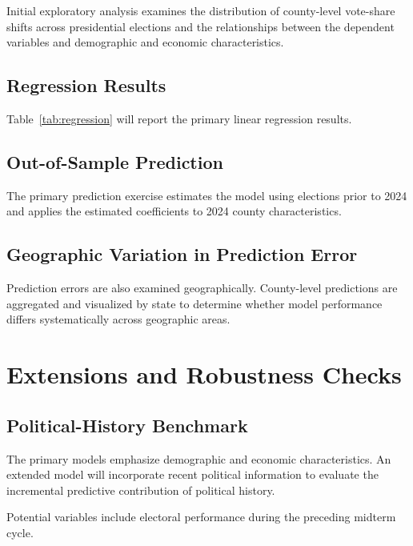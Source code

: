 \documentclass[12pt]{article}
\begin{document}
	Initial exploratory analysis examines the distribution of county-level
	vote-share shifts across presidential elections and the relationships
	between the dependent variables and demographic and economic
	characteristics.
	
	
	\subsection{Regression Results}
	
	Table~\ref{tab:regression} will report the primary linear regression
	results.
	
	
	
	\subsection{Out-of-Sample Prediction}
	
	The primary prediction exercise estimates the model using elections
	prior to 2024 and applies the estimated coefficients to 2024 county
	characteristics.

	
	
	\subsection{Geographic Variation in Prediction Error}
	
	Prediction errors are also examined geographically. County-level
	predictions are aggregated and visualized by state to determine
	whether model performance differs systematically across geographic
	areas.
	

	\section{Extensions and Robustness Checks}
	
	\subsection{Political-History Benchmark}
	
	The primary models emphasize demographic and economic characteristics.
	An extended model will incorporate recent political
	information to evaluate the incremental predictive contribution of
	political history.
	
	Potential variables include electoral performance during the preceding midterm cycle.
	
\end{document}
